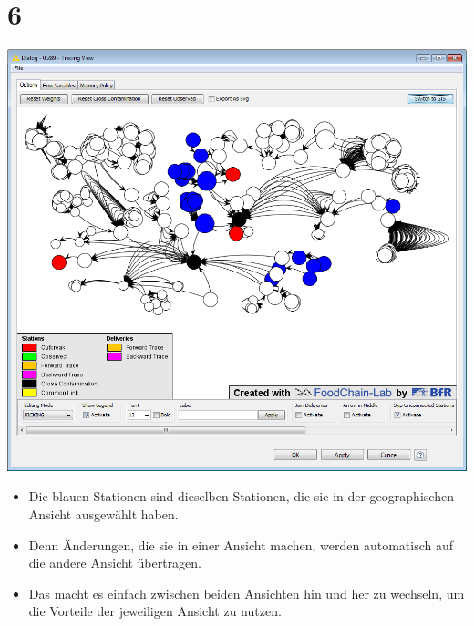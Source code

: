 \documentclass{beamer}
\begin{document}
\section{6}
\begin{frame}
	\begin{center}
  		\includegraphics[height=0.5\textheight]{6.png}
	\end{center}
	\begin{itemize}
		\item Die blauen Stationen sind dieselben Stationen, die sie in der geographischen Ansicht ausgewählt haben.
		\item Denn Änderungen, die sie in einer Ansicht machen, werden automatisch auf die andere Ansicht übertragen.
		\item Das macht es einfach zwischen beiden Ansichten hin und her zu wechseln, um die Vorteile der jeweiligen Ansicht zu nutzen.
	\end{itemize}
\end{frame}
\end{document}
